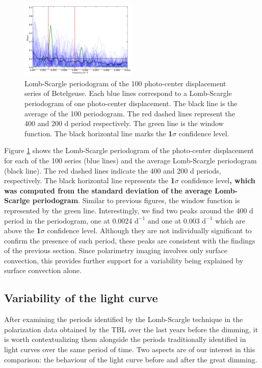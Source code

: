 \documentclass{aa}
\begin{document}
\begin{figure}[!h]
    \centering
    \includegraphics[width=0.5\textwidth]{Lomb-Scargle Photo-center.pdf}
    \caption{Lomb-Scargle periodogram of the 100 photo-center displacement series of Betelgeuse. Each blue lines correspond to a Lomb-Scargle periodogram of one photo-center
     displacement. The black line is the average of the 100 periodogram. The red dashed lines represent the 400 and 200 d period respectively.
     The green line is the window function. The black horizontal line marks the \textbf{1}$\sigma$ confidence level.}
    \label{LS photocenter}
\end{figure}

Figure \ref{LS photocenter} shows the Lomb-Scargle periodogram of the photo-center displacement for each of the 100 series (blue lines) and the average Lomb-Scargle periodogram (black line). The red dashed lines indicate the 400 and 
200 d periods, respectively. The black horizontal line represents the \textbf{1}$\sigma$ confidence level\textbf{, which was computed from the standard deviation of the average Lomb-Scarlge periodogram}. Similar to previous figures, the window function is represented by the green line. Interestingly, we find two peaks around the 400 d period in the periodogram, one at 0.0024 $\mathrm{d^{-1}}$ and one at 0.003 $\mathrm{d^{-1}}$ which are above the \textbf{1}$\sigma$ confidence level. Although they are not individually significant to confirm the presence of such period, these peaks are consistent with the findings of the previous section. Since polarimetry imaging involves only surface convection, this provides further support for a variability being explained by surface convection alone.


\subsection{Variability of the light curve}

After examining the periods identified by the Lomb-Scargle technique in the polarization data obtained by the TBL over the last years before the dimming, it is worth contextualizing them alongside the periods traditionally identified in light curves over the same period of time. Two aspects 
are of our interest in this comparison: the behaviour of the light curve before and after the great dimming.
\end{document}
